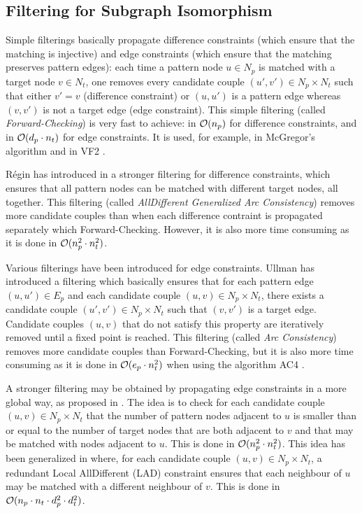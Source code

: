 \documentclass{llncs}
\begin{document}
\subsection{Filtering for Subgraph Isomorphism}

Simple filterings basically propagate difference constraints (which ensure that the matching is injective) and edge constraints (which ensure that the matching preserves pattern edges): each time a pattern node $u\in N_p$ is matched with a target node $v\in N_t$, one removes every candidate couple $(u',v')\in N_p\times N_t$ such that either $v'=v$ (difference constraint) or $(u,u')$ is a pattern edge whereas $(v,v')$ is not a target edge (edge constraint). This simple filtering (called {\em Forward-Checking}) is very fast to achieve: in ${\cal O}(n_p)$ for difference constraints, and in ${\cal O}(d_p\cdot n_t)$ for edge constraints. It is used, for example, in McGregor's algorithm \cite{mcgregor79} and in VF2 \cite{Cordella:2004}.

R\'egin has introduced in \cite{regin} a stronger filtering for difference constraints, which ensures that all pattern nodes can be matched with different target nodes, all together. This filtering (called {\em AllDifferent Generalized Arc Consistency}) removes more candidate couples than when each difference contraint is propagated separately which Forward-Checking. However, it is also more time consuming as it is done in ${\cal O}(n_p^2\cdot n_t^2)$.

Various filterings have been introduced for edge constraints. Ullman \cite{ullman} has introduced a filtering which basically ensures that for each pattern edge $(u,u')\in E_p$ and each candidate couple $(u,v)\in N_p\times N_t$, there exists a candidate couple $(u',v')\in N_p\times N_t$ such that $(v,v')$ is a target edge. Candidate couples $(u,v)$ that do not satisfy this property are iteratively removed until a fixed point is reached. This filtering (called {\em Arc Consistency}) removes more candidate couples than Forward-Checking, but it is also more time consuming as it is done in ${\cal O}(e_p\cdot n_t^2)$ when using the algorithm AC4  \cite{MH86}.

A stronger filtering may be obtained by propagating edge constraints in a more global way, as proposed in \cite{LV02}. The idea is to check for each candidate couple $(u,v)\in N_p\times N_t$ that the number of pattern nodes adjacent to $u$ is smaller than or equal to the number of target nodes that are both adjacent to $v$ and that may be matched with nodes adjacent to $u$. This is done in ${\cal O}(n_p^2\cdot n_t^2)$. This idea has been generalized in \cite{Solnon:2010} where, for each candidate couple $(u,v)\in N_p\times N_t$, a redundant Local AllDifferent (LAD) constraint ensures that each neighbour of $u$ may be matched with a different neighbour of $v$. This is done in ${\cal O}(n_p\cdot n_t\cdot d_p^2\cdot d_t^2)$.
\end{document}
